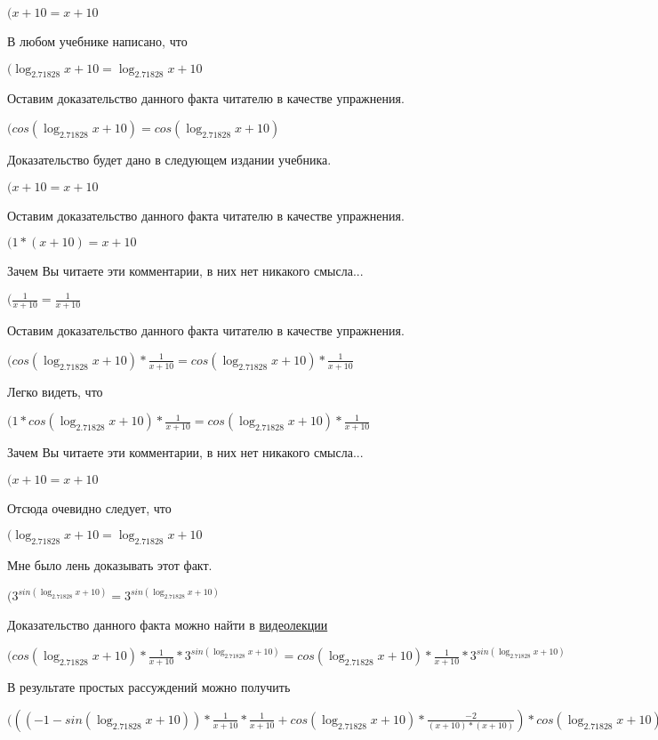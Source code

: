 \documentclass[12pt,a4paper,fleqn]{article}
\theoremstyle{definition}
\begin{document}
$( x  +  10  =  x  +  10 $

В любом учебнике написано, что

$(\log_{ 2.71828 }{ x  +  10 } = \log_{ 2.71828 }{ x  +  10 }$

Оставим доказательство данного факта читателю в качестве упражнения.

$(cos(\log_{ 2.71828 }{ x  +  10 }) = cos(\log_{ 2.71828 }{ x  +  10 })$

Доказательство будет дано в следующем издании учебника.

$( x  +  10  =  x  +  10 $

Оставим доказательство данного факта читателю в качестве упражнения.

$( 1  * ( x  +  10 ) =  x  +  10 $

Зачем Вы читаете эти комментарии, в них нет никакого смысла...

$(\frac{ 1 }{ x  +  10 }
 = \frac{ 1 }{ x  +  10 }
$

Оставим доказательство данного факта читателю в качестве упражнения.

$(cos(\log_{ 2.71828 }{ x  +  10 }) * \frac{ 1 }{ x  +  10 }
 = cos(\log_{ 2.71828 }{ x  +  10 }) * \frac{ 1 }{ x  +  10 }
$

Легко видеть, что

$( 1  * cos(\log_{ 2.71828 }{ x  +  10 }) * \frac{ 1 }{ x  +  10 }
 = cos(\log_{ 2.71828 }{ x  +  10 }) * \frac{ 1 }{ x  +  10 }
$

Зачем Вы читаете эти комментарии, в них нет никакого смысла...

$( x  +  10  =  x  +  10 $

Отсюда очевидно следует, что

$(\log_{ 2.71828 }{ x  +  10 } = \log_{ 2.71828 }{ x  +  10 }$

Мне было лень доказывать этот факт.

$({ 3 }^{sin(\log_{ 2.71828 }{ x  +  10 })} = { 3 }^{sin(\log_{ 2.71828 }{ x  +  10 })}$

Доказательство данного факта можно найти в \href{https://www.youtube.com/watch?v=dQw4w9WgXcQ}{видеолекции}

$(cos(\log_{ 2.71828 }{ x  +  10 }) * \frac{ 1 }{ x  +  10 }
 * { 3 }^{sin(\log_{ 2.71828 }{ x  +  10 })} = cos(\log_{ 2.71828 }{ x  +  10 }) * \frac{ 1 }{ x  +  10 }
 * { 3 }^{sin(\log_{ 2.71828 }{ x  +  10 })}$

В результате простых рассуждений можно получить

$((( -1  - sin(\log_{ 2.71828 }{ x  +  10 })) * \frac{ 1 }{ x  +  10 }
 * \frac{ 1 }{ x  +  10 }
 + cos(\log_{ 2.71828 }{ x  +  10 }) * \frac{ -2 }{( x  +  10 ) * ( x  +  10 )}
) * cos(\log_{ 2.71828 }{ x  +  10 }) * \frac{ 1 }{ x  +  10 }
 * { 3 }^{sin(\log_{ 2.71828 }{ x  +  10 })} = (( -1  - sin(\log_{ 2.71828 }{ x  +  10 })) * \frac{ 1 }{ x  +  10 }
 * \frac{ 1 }{ x  +  10 }
 + cos(\log_{ 2.71828 }{ x  +  10 }) * \frac{ -2 }{( x  +  10 ) * ( x  +  10 )}
) * cos(\log_{ 2.71828 }{ x  +  10 }) * \frac{ 1 }{ x  +  10 }
 * { 3 }^{sin(\log_{ 2.71828 }{ x  +  10 })}$
\end{document}
